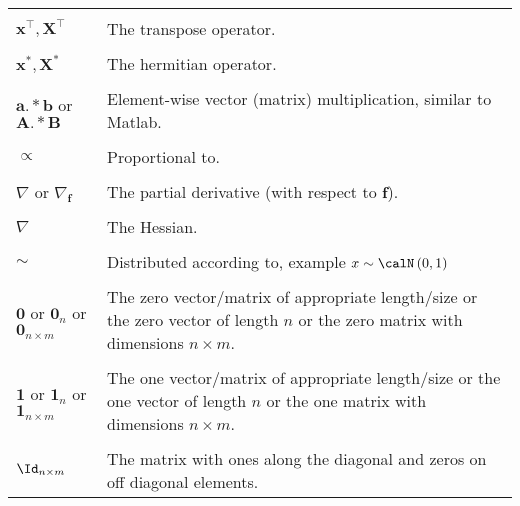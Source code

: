 \begin{longtable}{lp{}}
    \\\\
    $\bm{x}^{\intercal}, \bm{X}^{\intercal}$                                                                   & The transpose operator.
    \\\\
    $\bm{x}^{\ast}, \bm{X}^{\ast}$                                                                             & The hermitian operator.
    \\\\
    $\bm{a} .\ast \bm{b}$ or $\bm{A} .\ast \bm{B}$                                                             & Element-wise vector (matrix) multiplication, similar to Matlab.
    \\\\
    $\propto$                                                                                                  & Proportional to.
    \\\\
    $\nabla$ or $\nabla_{\bm{f}}$                                                                              & The partial derivative (with respect to $\bm{f}$).
    \\\\
    $\nabla$                                                                                                   & The Hessian.
    \\\\
    $\sim$                                                                                                     & Distributed according to, example $x \sim \calN \left( 0,1 \right)$
    \\\\
    $\bm{0}$ or $\bm{0}_{n}$ or $\bm{0}_{n \times m}$                                                          & The zero vector/matrix of appropriate length/size or the zero vector of length $n$ or the zero matrix with dimensions $n \times m$.
    \\\\
    $\bm{1}$ or $\bm{1}_{n}$ or $\bm{1}_{n \times m}$                                                          & The one vector/matrix of appropriate length/size or the one vector of length $n$ or the one matrix with dimensions $n \times m$.
    \\\\
    $\Id_{n \times m}$                                                                                         & The matrix with ones along the diagonal and zeros on off diagonal elements.

\end{longtable}
